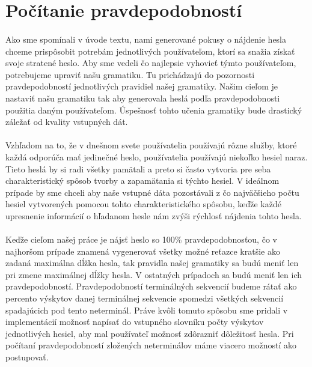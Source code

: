 \section{Počítanie pravdepodobností}
\paragraph{}
Ako sme spomínali v úvode textu, nami generované pokusy o nájdenie hesla chceme prispôsobit potrebám jednotlivých používateľom, ktorí sa snažia získať svoje stratené heslo. Aby sme vedeli čo najlepsie vyhovieť týmto používateľom, potrebujeme upraviť našu gramatiku. Tu prichádzajú do pozornosti pravdepodobností jednotlivých pravidiel našej gramatiky. Našim cieľom je nastaviť našu gramatiku tak aby generovala heslá podľa pravdepodobnosti použitia daným používateľom. Úspešnosť tohto učenia gramatiky bude drastický záležať od kvality vstupných dát.
\paragraph{}
Vzhľadom na to, že v dnešnom svete používatelia používajú rôzne služby, ktoré každá odporúča mať jedinečné heslo, používatelia používajú niekoľko hesiel naraz. Tieto heslá by si radi všetky pamätali a preto si často vytvoria pre seba charakteristický spôsob tvorby a zapamätania si týchto hesiel. V ideálnom prípade by sme chceli aby naše vstupné dáta pozostávali z čo najväčšieho počtu hesiel vytvorených pomocou tohto charakteristického spôsobu, keďže každé upresnenie informácií o hľadanom hesle nám zvýši rýchlosť nájdenia tohto hesla.
\paragraph{}
Keďže cieľom našej práce je nájsť heslo so 100\% pravdepodobnosťou, čo v najhoršom prípade znamená vygenerovať všetky možné reťazce kratšie ako zadaná maximálna dĺžka hesla, tak pravidla našej gramatiky sa budú meniť len pri zmene maximálnej dĺžky hesla. V ostatných prípadoch sa budú meniť len ich pravdepodobností. Pravdepodobností terminálných sekvencií budeme rátať ako percento výskytov danej terminálnej sekvencie spomedzi všetkých sekvencií spadajúcich pod tento neterminál. Práve kvôli tomuto spôsobu sme pridali v implementácií možnosť napísať do vstupného slovníku počty výskytov jednotlivých hesiel, aby mal používateľ možnosť zdôrazniť dôležitosť hesla. Pri počítaní pravdepodobností zložených neterminálov máme viacero možností ako postupovať.
